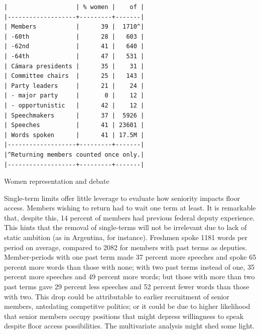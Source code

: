 \documentclass[letter,12pt]{article}
\begin{document}
\begin{table}
  \begin{scriptsize}
    \begin{verbatim}
|                   | % women |    of |
|-------------------+---------+-------|
| Members           |      39 |  1710^|
| -60th             |      28 |   603 |
| -62nd             |      41 |   640 |
| -64th             |      47 |   531 |
| Cámara presidents |      35 |    31 |
| Committee chairs  |      25 |   143 |
| Party leaders     |      21 |    24 |
| - major party     |       0 |    12 |
| - opportunistic   |      42 |    12 |
| Speechmakers      |      37 |  5926 |
| Speeches          |      41 | 23601 |
| Words spoken      |      41 | 17.5M |
|-------------------+---------+-------|
|^Returning members counted once only.|
|-------------------+---------+-------|
    \end{verbatim}
  \end{scriptsize}
\caption{Women representation and debate}\label{T:women}
\end{table}


Single-term limits offer little leverage to evaluate how seniority impacts floor access. Members wishing to return had to wait one term at least. It is remarkable that, despite this, 14 percent of members had previous federal deputy experience. This hints that the removal of single-terms will not be irrelevant due to lack of static ambition (as in Argentina, for instance). Freshmen spoke 1181 words per period on average, compared to 2082 for members with past terms as deputies. Member-periods with one past term made 37 percent more speeches and spoke 65 percent more words than those with none; with two past terms instead of one, 35 percent more speeches and 49 percent more words; but those with more than two past terms gave 29 percent less speeches and 52 percent fewer words than those with two. This drop could be attributable to earlier recruitment of senior members, antedating competitve politics; or it could be due to higher likelihood that senior members occupy positions that might depress willingness to speak despite floor access possibilities. The multivariate analysis might shed some light.  
\end{document}
